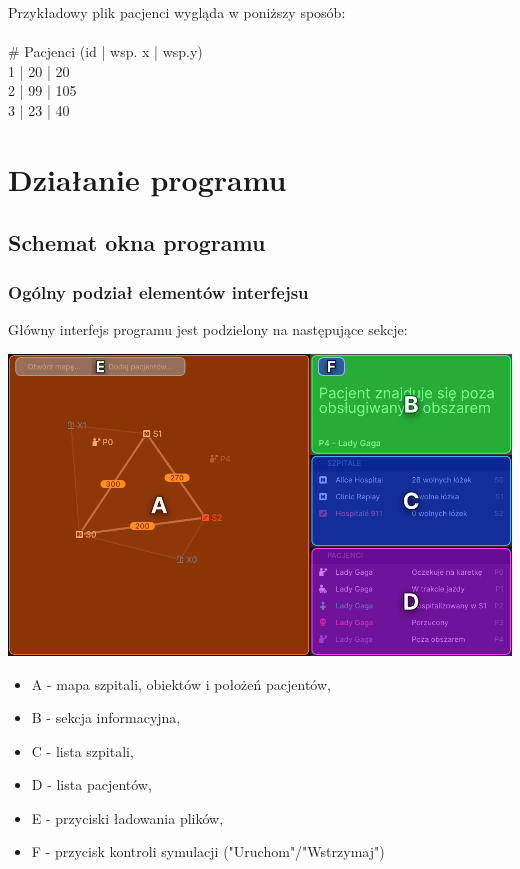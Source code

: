 \documentclass{article}
\begin{document}
 \vspace{0.5cm}
Przykładowy plik pacjenci wygląda w poniższy sposób:\\
 \\
\# Pacjenci (id | wsp. x | wsp.y)\\
1 | 20 | 20\\
2 | 99 | 105\\
3 | 23 | 40\\

\pagebreak
\section{Działanie programu}

\subsection{Schemat okna programu}

\subsubsection{Ogólny podział elementów interfejsu}
Główny interfejs programu jest podzielony na następujące sekcje: \\

 \vspace{0.5cm}
 
\centerline{\includegraphics[scale=0.3]{images/areas.png}}

 \vspace{0.7cm}
 
\begin{itemize}
    \item A - mapa szpitali, obiektów i położeń pacjentów,
    \item B - sekcja informacyjna,
    \item C - lista szpitali,
    \item D - lista pacjentów,
    \item E - przyciski ładowania plików,
    \item F - przycisk kontroli symulacji ("Uruchom"/"Wstrzymaj")
\end{itemize}
\end{document}
